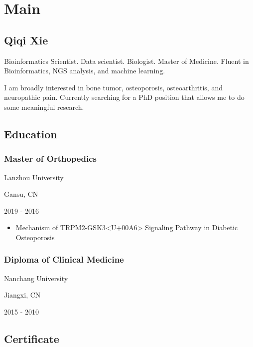 \documentclass[
]{article}
\providecommand{\tightlist}{%
  \setlength{\itemsep}{0pt}\setlength{\parskip}{0pt}}
\begin{document}
\hypertarget{main}{%
\section{Main}\label{main}}

\hypertarget{title}{%
\subsection{Qiqi Xie}\label{title}}

Bioinformatics Scientist. Data scientist. Biologist. Master of Medicine.
Fluent in Bioinformatics, NGS analysis, and machine learning.

I am broadly interested in bone tumor, osteoporosis, osteoarthritis, and
neuropathic pain. Currently searching for a PhD position that allows me
to do some meaningful research.

\hypertarget{education}{%
\subsection{Education}\label{education}}

\hypertarget{master-of-orthopedics}{%
\subsubsection{Master of Orthopedics}\label{master-of-orthopedics}}

Lanzhou University

Gansu, CN

2019 - 2016

\begin{itemize}
\tightlist
\item
  Mechanism of TRPM2-GSK3\textless U+00A6\textgreater{} Signaling
  Pathway in Diabetic Osteoporosis
\end{itemize}

\hypertarget{diploma-of-clinical-medicine}{%
\subsubsection{Diploma of Clinical
Medicine}\label{diploma-of-clinical-medicine}}

Nanchang University

Jiangxi, CN

2015 - 2010

\hypertarget{certificate}{%
\subsection{Certificate}\label{certificate}}
\end{document}
